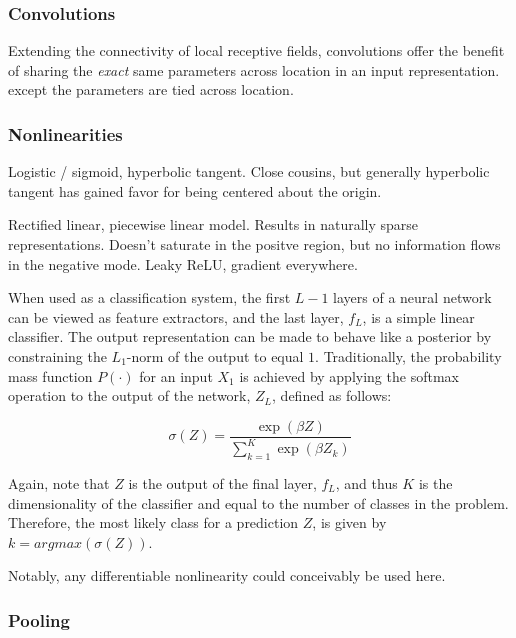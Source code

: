\subsubsection{Convolutions}

Extending the connectivity of local receptive fields, convolutions offer the benefit of sharing the \emph{exact} same parameters across location in an input representation.
except the parameters are tied across location.



\subsubsection{Nonlinearities}

Logistic / sigmoid, hyperbolic tangent.
Close cousins, but generally hyperbolic tangent has gained favor for being centered about the origin.

Rectified linear, piecewise linear model. %
Results in naturally sparse representations.
Doesn't saturate in the positve region, but no information flows in the negative mode.
Leaky ReLU, gradient everywhere.

When used as a classification system, the first $L-1$ layers of a neural network can be viewed as feature extractors, and the last layer, $f_L$, is a simple linear classifier.
The output representation can be made to behave like a posterior by constraining the $L_1$-norm of the output to equal $1$.
Traditionally, the probability mass function $P(\cdot)$ for an input $X_1$ is achieved by applying the softmax operation to the output of the network, $Z_L$, defined as follows:

\begin{equation}
\label{eq:softmax}
\sigma(Z) = \frac{\exp(\beta Z)}{ \sum_{k=1}^{K}\exp{(\beta Z_k)}}
\end{equation}

\noindent Again, note that $Z$ is the output of the final layer, $f_L$, and thus $K$ is the dimensionality of the classifier and equal to the number of classes in the problem.
Therefore, the most likely class for a prediction $Z$, is given by $k = argmax(\sigma(Z))$.

Notably, any differentiable nonlinearity could conceivably be used here.


\subsubsection{Pooling}

